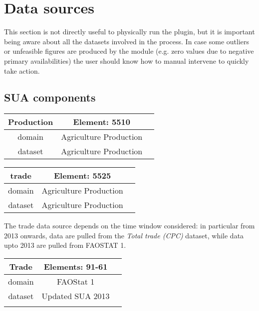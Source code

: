 \documentclass[nojss]{jss}
\newcommand{\head}[1]{\textnormal{\textbf{#1}}}
\begin{document}
\section {Data sources}

This section is not directly useful to physically run the plugin, but it is important being aware about all the datasets involved in the process. In case some outliers or unfeasible figures are produced by the module (e.g. zero values due to negative primary availabilities) the user should know how to manual intervene  to quickly take action. 

\subsection{SUA components}

\begin{tabular}{ccc}
  \toprule[1.5pt]
  \head{Production} & Element: 5510  \\
  \midrule
  domain         & Agriculture Production     \\
  dataset        & Agriculture Production  \\
  \bottomrule[1.5pt]
\end{tabular}

\bigskip


\begin{tabular}{ccc}
  \toprule[1.5pt]
  \head{trade} &  Element: 5525   \\
  \midrule
  domain         & Agriculture Production     \\
  dataset        & Agriculture Production  \\
  \bottomrule[1.5pt]
\end{tabular}

\bigskip

The trade data source depends on the time window considered: in particular from 2013 onwards, data are pulled from the \textit{Total trade (CPC)} dataset, while data upto 2013 are pulled from FAOSTAT 1.


\bigskip

\begin{tabular}{ccc}
  \toprule[1.5pt]
  \head{Trade} &  Elements: 91-61   \\
  \midrule
  domain         & FAOStat 1    \\
  dataset        &  Updated SUA 2013\\
  \bottomrule[1.5pt]
  \caption{\textit{Trade up to 2013}}
 \end{tabular}
\end{document}
